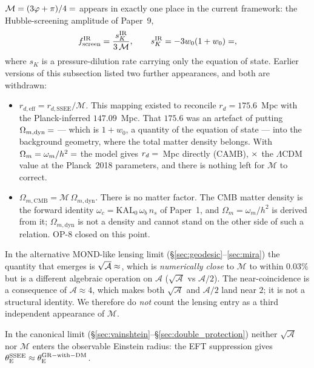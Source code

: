 \documentclass[12pt,a4paper]{article}
\newcommand{\phiG}{\varphi}
\newcommand{\MIRA}{\mathcal{M}}
\newcommand{\AURA}{\mathcal{A}}
\newcommand{\Omm}{\Omega_{m}}
\newcommand{\thetaE}{\theta_{\mathrm{E}}}
\begin{document}
$\MIRA = (3\phiG+\pi)/4 = \val{MIRA_d6}$ appears in exactly one place in the
current framework: the Hubble-screening amplitude of Paper~9,
\begin{equation}
  f_{\rm screen}^{\rm IR} = \frac{s_K^{\rm IR}}{3\,\MIRA}, \qquad
  s_K^{\rm IR} = -3w_0(1+w_0) = \val{S_K_d6},
\end{equation}
where $s_K$ is a pressure-dilution rate carrying only the equation of
state.  Earlier versions of this subsection listed two further
appearances, and both are withdrawn:
\begin{itemize}
  \item $r_{d,\mathrm{eff}} = r_{d,\mathrm{SSEE}}/\MIRA$.  This mapping
    existed to reconcile $r_d = 175.6$~Mpc with the Planck-inferred $147.09$~Mpc.
    That $175.6$ was an artefact of putting $\Omega_{m,\mathrm{dyn}}=\val{S_M_d6}$
    --- which is $1+w_0$, a quantity of the equation of state --- into the
    background geometry, where the total matter density belongs.  With
    $\Omm = \omega_m/h^2 = \val{OMEGA_M_TOTAL_d6}$ the model gives $r_d = \val{p2_lyaB_rd}$~Mpc
    directly (CAMB), $\val{p2_rd_ratio}\times$ the $\Lambda$CDM value at the Planck~2018 parameters, and there is nothing
    left for $\MIRA$ to correct.
  \item $\Omega_{m,\mathrm{CMB}} = \MIRA\,\Omega_{m,\mathrm{dyn}}$.  There
    is no matter factor.  The CMB matter density is the forward identity
    $\omega_c = \mathrm{KAL}_0\,\omega_b\,n_s$ of Paper~1, and
    $\Omm = \omega_m/h^2$ is derived from it; $\Omega_{m,\mathrm{dyn}}$ is
    not a density and cannot stand on the other side of such a relation.
    OP-8 closed on this point.
\end{itemize}

In the alternative MOND-like lensing limit (\S\ref{sec:geodesic}--\ref{sec:mira})
the quantity that emerges is $\sqrt{\AURA}\approx \val{sqrt_AURA_d5}$, which is
\emph{numerically close} to $\MIRA$ to within $0.03\%$ but is a different
algebraic operation on $\AURA$ ($\sqrt{\AURA}$ vs $\AURA/2$). The
near-coincidence is a consequence of $\AURA \approx 4$, which makes both
$\sqrt{\AURA}$ and $\AURA/2$ land near $2$; it is not a structural identity.
We therefore do \emph{not} count the lensing entry as a third independent
appearance of $\MIRA$.

In the canonical limit
(\S\ref{sec:vainshtein}--\S\ref{sec:double_protection}) neither $\sqrt{\AURA}$
nor $\MIRA$ enters the observable Einstein radius: the EFT suppression
gives $\thetaE^{\rm SSEE}\approx\thetaE^{\rm GR-with-DM}$.
\end{document}

